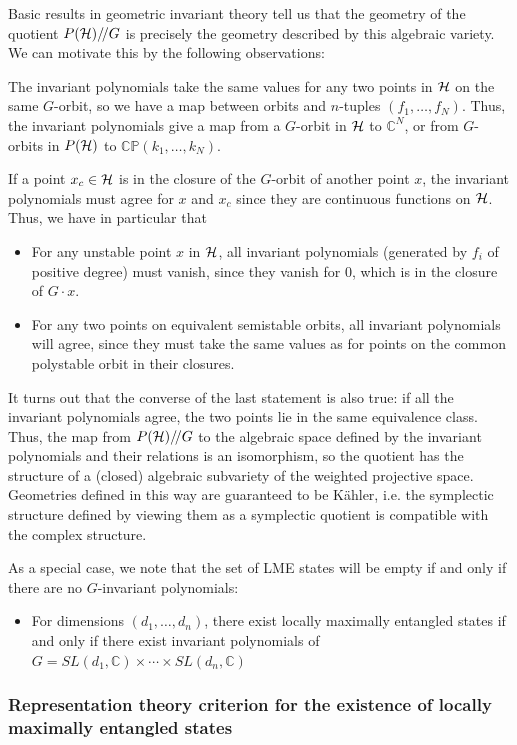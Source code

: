 \documentclass[12pt]{article}
\theoremstyle{definition}
\newcommand{\GITquot}{/\!/}
\begin{document}
Basic results in geometric invariant theory tell us that the geometry of the quotient $P({\cal H})\GITquot G$ is precisely the geometry described by this algebraic variety. We can motivate this by the following observations:

The invariant polynomials take the same values for any two points in ${\cal H}$ on the same $G$-orbit, so we have a map between orbits and $n$-tuples $(f_1,\dots,f_N)$. Thus, the invariant polynomials give a map from a $G$-orbit in ${\cal H}$ to $\mathbb{C}^N$, or from $G$-orbits in $P({\cal H})$ to $\mathbb{C P}(k_1,\dots,k_N)$.

If a point $x_c \in {\cal H}$ is in the closure of the $G$-orbit of another point $x$, the invariant polynomials must agree for $x$ and $x_c$ since they are continuous functions on ${\cal H}$. Thus, we have in particular that
\begin{itemize}
\item
For any unstable point $x$ in ${\cal H}$, all invariant polynomials (generated by $f_i$ of positive degree) must vanish, since they vanish for $0$, which is in the closure of $G \cdot x$.
\item
For any two points on equivalent semistable orbits, all invariant polynomials will agree, since they must take the same values as for points on the common polystable orbit in their closures.
\end{itemize}
It turns out that the converse of the last statement is also true: if all the invariant polynomials agree, the two points lie in the same equivalence class. Thus, the map from $P({\cal H})\GITquot G$ to the algebraic space defined by the invariant polynomials and their relations is an isomorphism, so the quotient has the structure of a (closed) algebraic
subvariety of the weighted projective space. Geometries defined in this way are guaranteed to be K\"ahler, i.e. the symplectic structure defined by viewing them as a symplectic quotient is compatible with the complex structure.

As a special case, we note that the set of LME states will be empty if and only if there are no $G$-invariant polynomials:
\begin{itemize}
\item
For dimensions $(d_1, \dots, d_n)$, there exist locally maximally entangled states if and only if there exist invariant polynomials of $G = SL(d_1, \mathbb{C}) \times \cdots \times SL(d_n, \mathbb{C})$
\end{itemize}

\subsubsection*{Representation theory criterion for the existence of locally maximally entangled states}
\end{document}
